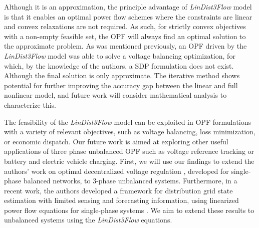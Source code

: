  Although it is an approximation, the principle advantage of \emph{LinDist3Flow} model is that it enables an optimal power flow schemes where the constraints are linear and convex relaxations are not required.  As such, for strictly convex objectives with a non-empty feasible  set, the OPF will always find an optimal solution to the approximate problem.  As was mentioned previously, an OPF driven by the \textit{LinDist3Flow} model was able to solve a voltage balancing optimization, for which, by the knowledge of the authors, a SDP formulation does not exist.  Although the final solution is only approximate. The iterative method shows potential for further improving the accuracy gap between the linear and full nonlinear model, and future work will consider mathematical analysis to characterize this.

The feasibility of the \emph{LinDist3Flow} model can be exploited in OPF formulations with a variety of relevant objectives, such as voltage balancing, loss minimization, or economic dispatch. Our future work is aimed at exploring other useful applications of three phase unbalanced OPF such as voltage reference tracking or battery and electric vehicle charging. First, we will use our findings to extend the authors' work on optimal decentralized voltage regulation  \cite{sondermeijer2015regression}, developed for single-phase balanced networks, to 3-phase unbalanced systems. Furthermore, in a recent work, the authors developed a framework for distribution grid state estimation with limited sensing and forecasting information, using linearized power flow equations for single-phase systems \cite{dobbe2015real}. We aim to extend these results to unbalanced systems using the \emph{LinDist3Flow} equations.

  
